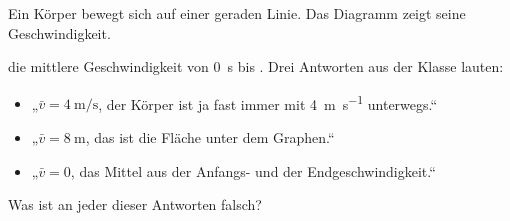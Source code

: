 Ein Körper bewegt sich auf einer geraden Linie. Das Diagramm zeigt seine Geschwindigkeit.
\begin{center}
\end{center}
\begin{abcliste}
\abc {} die mittlere Geschwindigkeit von \SI{0}{\second} bis \tEO.
\abc Drei Antworten aus der Klasse lauten:
\begin{itemize}
\item[(i)] „$\bar v = \SI{4}{\meter\per\second}$, der Körper ist ja fast immer mit \SI{4}{\meter\per\second} unterwegs.“
\item[(ii)] „$\bar v = \SI{8}{\meter}$, das ist die Fläche unter dem Graphen.“
\item[(iii)] „$\bar v = 0$, das Mittel aus der Anfangs- und der Endgeschwindigkeit.“
\end{itemize}
Was ist an jeder dieser Antworten falsch?
\end{abcliste}
